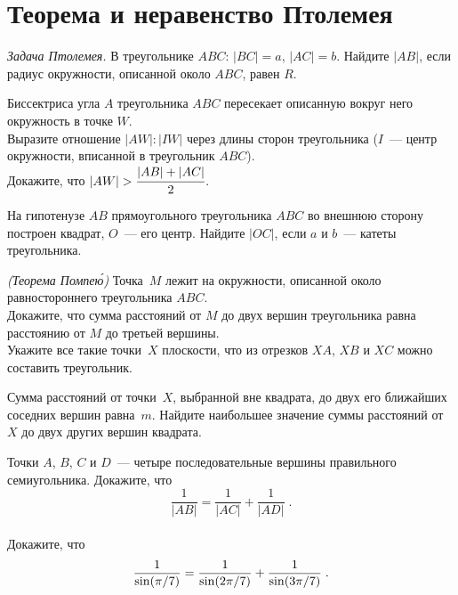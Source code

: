 
\section*{Теорема и неравенство Птолемея}


\begingroup \def\piconst{\mathrm{\pi}}

\begin{problems}

\item\emph{Задача Птолемея.}
В треугольнике $ABC$: $\lvert BC \rvert = a$, $\lvert AC \rvert = b$.
Найдите $\lvert AB \rvert$, если радиус окружности, описанной около $ABC$,
равен $R$.

\item
Биссектриса угла $A$ треугольника $ABC$ пересекает описанную вокруг него
окружность в точке $W$.
\\
\subproblem
Выразите отношение $\lvert AW \rvert : \lvert IW \rvert$ через длины сторон
треугольника ($I$~--- центр окружности, вписанной в треугольник $ABC$).
\\[0.5ex]
\subproblem
Докажите, что
\(
    \lvert AW \rvert
>
    \cfrac{\lvert AB \rvert + \lvert AC \rvert}{2}
\).

\item
На гипотенузе $AB$ прямоугольного треугольника $ABC$ во внешнюю сторону
построен квадрат, $O$~--- его центр.
Найдите $\lvert OC \rvert$, если $a$ и $b$~--- катеты треугольника.


\item\emph{(Теорема Помпе\'{ю})}
Точка~$M$ лежит на окружности, описанной около равностороннего
треугольника $ABC$.
\\
\subproblem
Докажите, что сумма расстояний от $M$ до двух вершин треугольника равна
расстоянию от $M$ до третьей вершины.
\\
\subproblem
Укажите все такие точки~$X$ плоскости, что из отрезков $XA$, $XB$ и $XC$ можно
составить треугольник.

\item
Сумма расстояний от точки~$X$, выбранной вне квадрата, до двух его ближайших
соседних вершин равна~$m$.
Найдите наибольшее значение суммы расстояний от $X$ до двух других вершин
квадрата.

\item
\subproblem
Точки $A$, $B$, $C$ и $D$~--- четыре последовательные вершины правильного
семиугольника.
Докажите, что
\[
    \frac{1}{\lvert AB \rvert}
=
    \frac{1}{\lvert AC \rvert} + \frac{1}{\lvert AD \rvert}
\; . \]
\\
\subproblem
Докажите, что
\[
    \frac{1}{\sin (\piconst / 7)}
=
    \frac{1}{\sin (2 \piconst / 7)}
    +
    \frac{1}{\sin (3 \piconst / 7)}
\; . \]


\end{problems}
